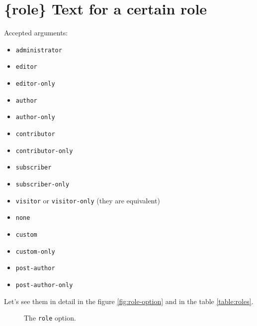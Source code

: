 \section{\{role\} Text for a certain role}

Accepted arguments:

\begin{itemize}
 \item \verb+administrator+
 \item \verb+editor+
 \item \verb+editor-only+
 \item \verb+author+
 \item \verb+author-only+
 \item \verb+contributor+
 \item \verb+contributor-only+
 \item \verb+subscriber+
 \item \verb+subscriber-only+
 \item \verb+visitor+ or \verb+visitor-only+ (they are equivalent)
 \item \verb+none+
 \item \verb+custom+
 \item \verb+custom-only+
 \item \verb+post-author+
 \item \verb+post-author-only+
\end{itemize}

Let's see them in detail in the figure \vref{fig:role-option} and in the table \vref{table:roles}.

\begin{figure}[]
	\centering
	\caption{The \texttt{role} option.}
  \label{fig:role-option}
\end{figure}

